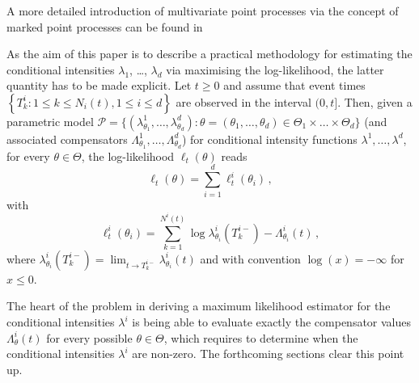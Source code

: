     \begin{remark}
    A more detailed introduction of multivariate point processes via the concept of marked point processes can be found in \cite[Chapter 6.4]{DaleyV1}
    \end{remark}

    As the aim of this paper is to describe a practical methodology for estimating the conditional intensities \(\lambda_1\), \dots, \(\lambda_d\) via maximising the log-likelihood, the latter quantity has to be made explicit.
    Let \(t \ge 0\) and assume that event times
    $\left\{ T_k^i : 1 \le k \le N_i(t), 1 \le i \le d \right\}$
    are observed in the interval \((0, t]\).
    Then, given a parametric model $\mathcal{P} = \{(\lambda_{\theta_1}^1, \dots, \lambda_{\theta_d}^d)\colon \theta = (\theta_1, \dots, \theta_d) \in \Theta_1 \times \dots \times \Theta_d\}$ (and associated compensators \(\Lambda_{\theta_1}^1, \dots, \Lambda_{\theta_d}^d\)) for conditional intensity functions \(\lambda^1, \dots, \lambda^d\), for every \(\theta \in \Theta\), the log-likelihood $\ell_t(\theta)$ reads \cite[Proposition 7.3.III.]{DaleyV1}
    \begin{equation*}
      \ell_t(\theta) = \sum_{i=1}^{d}{\ell_t^i(\theta_i)}\,,\nonumber 
    \end{equation*}
    with
    \begin{equation}\label{eq:chap2_general_log_likelihood}
      \ell_t^{i}(\theta_i) = \sum_{k=1}^{N^i(t)}{\log{\lambda^i_{\theta_i}(T_k^{i-})}} - \Lambda_{\theta_i}^i(t)\,,
    \end{equation}
    where $\lambda^i_{\theta_i}(T_k^{i-}) = \lim_{t\to T_k^{i-}}{\lambda_{\theta_i}^i(t)}$ and with convention $\log{(x)} = -\infty$ for $x\leq 0$.

    The heart of the problem in deriving a maximum likelihood estimator for the conditional intensities \(\lambda^i\) is being able to evaluate exactly the compensator values \(\Lambda_\theta^i(t)\) for every possible \(\theta \in \Theta\), which requires to determine when the conditional intensities \(\lambda^i\) are non-zero.
    The forthcoming sections clear this point up.


